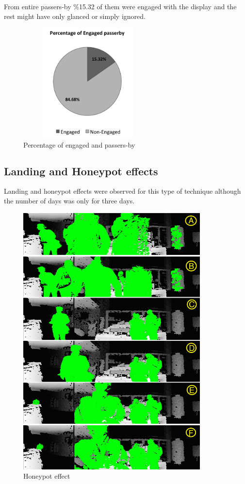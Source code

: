 From entire passers-by \%15.32 of them were engaged with the display and the rest might have only glanced or simply ignored.

\begin{figure}[H]
    \centering
    \includegraphics[width=70mm,height=60mm]{Figures/9/newbody_eng_percentage}
    \caption{Percentage of engaged and passers-by}%
    \label{fig:newbodyengagedpasserbypercentage}%
\end{figure}


\subsection{Landing and Honeypot effects}

Landing and honeypot effects were observed for this type of technique although the number of days was only for three days. 


\begin{figure}[H]
    \centering
    \includegraphics[width=\textwidth,height=140mm]{Figures/9/effects/honeypot}
    \caption{Honeypot effect}%
    \label{fig:newbodyhoneypoteffect}%
\end{figure}

